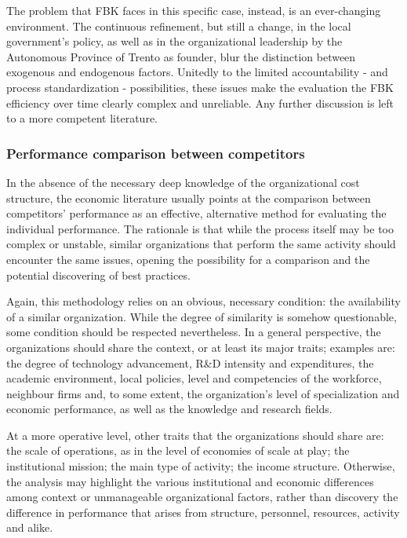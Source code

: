 The problem that FBK faces in this specific case, instead, is an ever-changing environment. The continuous refinement, but still a change, in the local government's policy, as well as in the organizational leadership by the Autonomous Province of Trento as founder, blur the distinction between exogenous and endogenous factors. Unitedly to the limited accountability - and process standardization - possibilities, these issues make the evaluation the FBK efficiency over time clearly complex and unreliable. Any further discussion is left to a more competent literature.

\subsubsection{Performance comparison between competitors}

In the absence of the necessary deep knowledge of the organizational cost structure, the economic literature usually points at the comparison between competitors' performance as an effective, alternative method for evaluating the individual performance. The rationale is that while the process itself may be too complex or unstable, similar organizations that perform the same activity should encounter the same issues, opening the possibility for a comparison and the potential discovering of best practices.

Again, this methodology relies on an obvious, necessary condition: the availability of a similar organization. While the degree of similarity is somehow questionable, some condition should be respected nevertheless. In a general perspective, the organizations should share the context, or at least its major traits; examples are: the degree of technology advancement, R\&D intensity and expenditures, the academic environment, local policies, level and competencies of the workforce, neighbour firms and, to some extent, the organization's level of specialization and economic performance, as well as the knowledge and research fields.

At a more operative level, other traits that the organizations should share are: the scale of operations, as in the level of economies of scale at play; the institutional mission; the main type of activity; the income structure. Otherwise, the analysis may highlight the various institutional and economic differences among context or unmanageable organizational factors, rather than discovery the difference in performance that arises from structure, personnel, resources, activity and alike.

